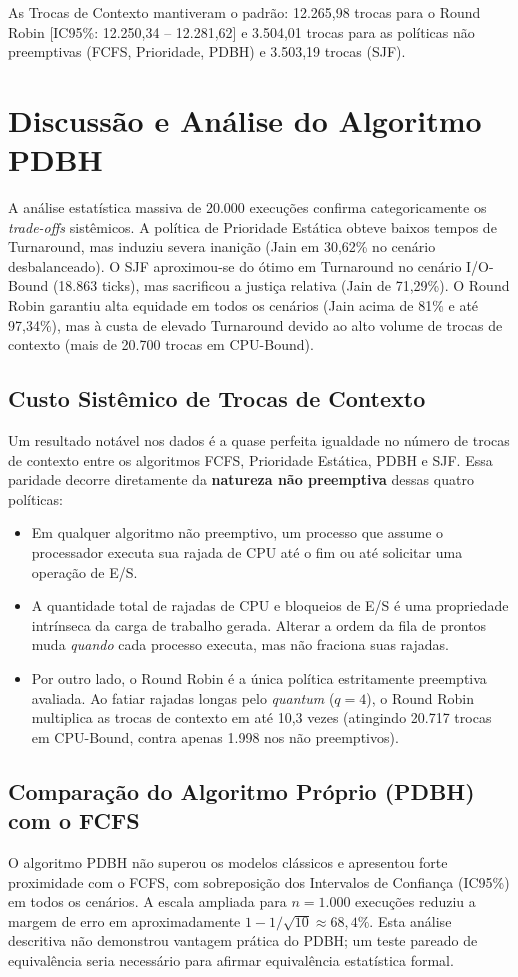 \documentclass[conference]{IEEEtran}
\begin{document}
As Trocas de Contexto mantiveram o padrão: 12.265,98 trocas para o Round Robin [IC95\%: 12.250,34 -- 12.281,62] e 3.504,01 trocas para as políticas não preemptivas (FCFS, Prioridade, PDBH) e 3.503,19 trocas (SJF).

\section{Discussão e Análise do Algoritmo PDBH}
A análise estatística massiva de 20.000 execuções confirma categoricamente os \textit{trade-offs} sistêmicos. A política de Prioridade Estática obteve baixos tempos de Turnaround, mas induziu severa inanição (Jain em 30,62\% no cenário desbalanceado). O SJF aproximou-se do ótimo em Turnaround no cenário I/O-Bound (18.863 ticks), mas sacrificou a justiça relativa (Jain de 71,29\%). O Round Robin garantiu alta equidade em todos os cenários (Jain acima de 81\% e até 97,34\%), mas à custa de elevado Turnaround devido ao alto volume de trocas de contexto (mais de 20.700 trocas em CPU-Bound).

\subsection{Custo Sistêmico de Trocas de Contexto}
Um resultado notável nos dados é a quase perfeita igualdade no número de trocas de contexto entre os algoritmos FCFS, Prioridade Estática, PDBH e SJF. Essa paridade decorre diretamente da \textbf{natureza não preemptiva} dessas quatro políticas:
\begin{itemize}
    \item Em qualquer algoritmo não preemptivo, um processo que assume o processador executa sua rajada de CPU até o fim ou até solicitar uma operação de E/S.
    \item A quantidade total de rajadas de CPU e bloqueios de E/S é uma propriedade intrínseca da carga de trabalho gerada. Alterar a ordem da fila de prontos muda \textit{quando} cada processo executa, mas não fraciona suas rajadas.
    \item Por outro lado, o Round Robin é a única política estritamente preemptiva avaliada. Ao fatiar rajadas longas pelo \textit{quantum} ($q = 4$), o Round Robin multiplica as trocas de contexto em até 10,3 vezes (atingindo 20.717 trocas em CPU-Bound, contra apenas 1.998 nos não preemptivos).
\end{itemize}

\subsection{Comparação do Algoritmo Próprio (PDBH) com o FCFS}
O algoritmo PDBH não superou os modelos clássicos e apresentou forte proximidade com o FCFS, com sobreposição dos Intervalos de Confiança (IC95\%) em todos os cenários. A escala ampliada para $n = 1.000$ execuções reduziu a margem de erro em aproximadamente $1 - 1/\sqrt{10} \approx 68{,}4\%$. Esta análise descritiva não demonstrou vantagem prática do PDBH; um teste pareado de equivalência seria necessário para afirmar equivalência estatística formal.
\end{document}
